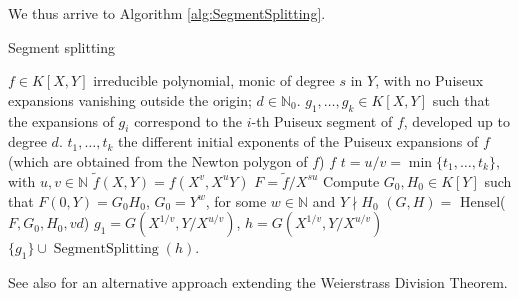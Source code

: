 \documentclass[a4paper,11pt]{amsart}%
\theoremstyle{definition}
\theoremstyle{plain}
\theoremstyle{remark}
\DeclareMathOperator{\SegmentSplitting}{SegmentSplitting}
\newcommand{\N}{{\mathbb N}}
\begin{document}
We thus arrive to Algorithm \ref{alg:SegmentSplitting}.

\begin{algorithm}                      %
\caption{Segment splitting}          %
\label{alg:SegmentSplitting}
\begin{algorithmic}[1]
\REQUIRE $f \in K[X,Y]$ irreducible polynomial, monic of degree $s$ in $Y$, with no Puiseux expansions vanishing outside the origin; $d \in \N_0$.
\ENSURE $g_1, \dots, g_k \in K[X,Y]$ such that the expansions of $g_i$ correspond to the $i$-th Puiseux segment of $f$, developed up to degree $d$.
\STATE $t_1, \dots, t_k$ the different initial exponents of the Puiseux expansions of $f$ (which are obtained from the Newton polygon of $f$)
 \RETURN $f$
\ENDIF
\STATE $t = u/v = \min\{t_1, \dots, t_k\}$, with $u, v \in \N$
\STATE $\tilde f(X, Y) = f(X^v, X^uY)$
\STATE $F = \tilde f / X^{su}$
\STATE Compute $G_0, H_0 \in K[Y]$ such that $F(0, Y) = G_0 H_0$, $G_0 = Y^w$,
for some $w \in \N$ and $Y \nmid H_0$
\STATE $(G, H) = $ Hensel($F, G_0, H_0, vd$)
\STATE $g_1 = G(X^{1/v}, Y/X^{u/v})$, $h = G(X^{1/v}, Y/X^{u/v})$
\RETURN $\{g_1\} \cup \SegmentSplitting(h)$.
\end{algorithmic}
\end{algorithm}


See also \cite[Theorem W]{JP} for an alternative approach extending the
Weierstrass Division Theorem.
\end{document}
